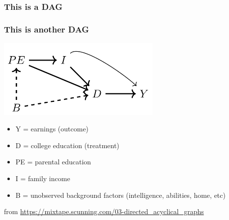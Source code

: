 \documentclass[aspectratio=43]{beamer}
\begin{document}
\begin{frame}
\frametitle{This is a DAG}
\centering


\end{frame}


\begin{frame}
\frametitle{This is another DAG}
\centering

\includegraphics[width = 0.6\textwidth]{../img/dag_earnings}

\vspace{15pt}

\begin{itemize}\footnotesize
  \item Y = earnings (outcome)
  \item D = college education (treatment)
  \item PE = parental education
  \item I = family income
  \item B = unobserved background factors (intelligence, abilities, home, etc)
\end{itemize}



{\tiny from \url{https://mixtape.scunning.com/03-directed_acyclical_graphs}}

\end{frame}
\end{document}
